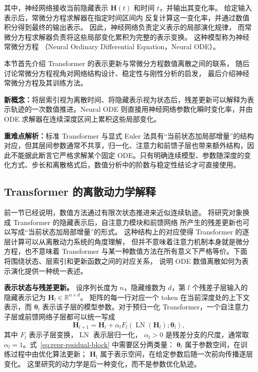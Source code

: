 \documentclass[UTF8,a4paper,zihao=-4,oneside,openany]{ctexbook}
\begin{document}
其中，神经网络接收当前隐藏表示
\(\boldsymbol{H}(t)\)
和时间 \(t\)，并输出其变化率。
给定输入表示后，常微分方程求解器在指定时间区间内
反复计算这一变化率，并通过数值积分得到最终的输出表示。
因此，神经网络负责定义表示的局部演化规律，
而常微分方程求解器负责将这些局部变化累积为完整的表示变换。
这种模型称为神经常微分方程
（Neural Ordinary Differential Equation，Neural ODE）。

本节首先介绍 Transformer 的表示更新与常微分方程数值离散之间的联系，
随后讨论常微分方程视角对网络结构设计、稳定性与刚性分析的启发，
最后介绍神经常微分方程及其训练方法。

\begin{importantnote}
\textbf{新概念：}将层索引视为离散时间、将隐藏表示视为状态后，残差更新可以解释为表示轨迹的一次数值推进。Neural ODE 则直接用神经网络参数化瞬时变化率，并由 ODE 求解器在连续深度区间上累积这些局部变化。

\textbf{重难点解析：}标准 Transformer 与显式 Euler 法具有“当前状态加局部增量”的结构对应，但其层间参数通常不共享，归一化、注意力和前馈子层也带来额外结构，因此不能据此断言它严格求解某个固定 ODE。只有明确连续模型、参数随深度的变化方式、步长和离散格式后，数值分析中的阶数与稳定性结论才可直接使用。
\end{importantnote}

\subsection{Transformer 的离散动力学解释}

前一节已经说明，数值方法通过有限次状态推进来近似连续轨迹。
将研究对象换成 Transformer 的隐藏表示后，自注意力模块和前馈网络
所产生的残差更新也可以写成“当前状态加局部增量”的形式。
这种结构上的对应使得 Transformer 的逐层计算可以从离散动力系统的角度理解，
但并不意味着注意力机制本身就是微分方程，也不意味着 Transformer
与某一种数值方法在所有意义下严格等价。下面将围绕状态、层索引和更新函数之间的对应关系，
说明 ODE 数值离散如何为表示演化提供一种统一表述。

\textbf{表示状态与残差更新。}
设序列长度为 \(n\)，隐藏维数为 \(d\)，第 \(l\) 个残差子层输入的
隐藏表示记为
\(\boldsymbol{H}_{l}\in\mathbb{R}^{n\times d}\)。
矩阵的每一行对应一个 token 在当前深度处的上下文表示，而
\(\boldsymbol{\theta}_{l}\) 表示该子层的模型参数。对于预归一化
Transformer，一个自注意力子层或前馈网络子层都可以统一写成
\begin{equation}
    \boldsymbol{H}_{l+1}
    =
    \boldsymbol{H}_{l}
    +
    \alpha_l
    F_l\!\left(
        \operatorname{LN}(\boldsymbol{H}_{l});
        \boldsymbol{\theta}_{l}
    \right),
    \label{eq:repr-residual-block}
\end{equation}
其中 \(F_l\) 表示子层变换，\(\operatorname{LN}\) 表示层归一化，
\(\alpha_l>0\) 是残差分支的尺度，通常取
\(\alpha_l=1\)。式~\eqref{eq:repr-residual-block} 中需要区分两类量：
\(\boldsymbol{\theta}_{l}\) 属于参数空间，在训练过程中由优化算法更新；
\(\boldsymbol{H}_{l}\) 属于表示空间，在给定参数后随一次前向传播逐层变化。
这里研究的动力学是后一种变化，而不是参数优化轨迹。
\end{document}
